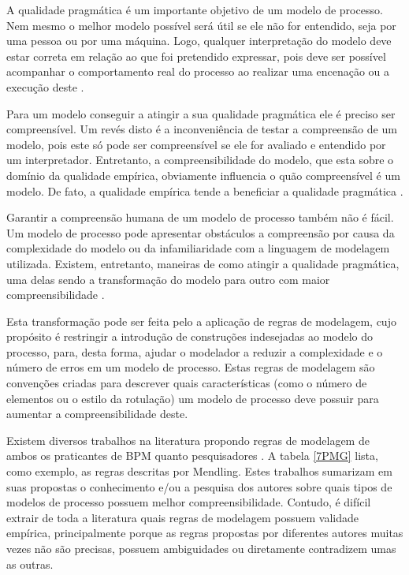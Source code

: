 \documentclass[12pt]{article}
\begin{document}
A qualidade pragmática é um importante objetivo de um modelo de processo. Nem mesmo o melhor modelo possível será útil se ele não for entendido, seja por uma pessoa ou por uma máquina. Logo, qualquer interpretação do modelo deve estar correta em relação ao que foi pretendido expressar, pois deve ser possível acompanhar o comportamento real do processo ao realizar uma encenação ou a execução deste \cite{Krogstie2012}.

Para um modelo conseguir a atingir a sua qualidade pragmática ele é preciso ser compreensível. Um revés disto é a inconveniência de testar a compreensão de um modelo, pois este só pode ser compreensível se ele for avaliado e entendido por um interpretador. Entretanto, a compreensibilidade do modelo, que esta sobre o domínio da qualidade empírica, obviamente influencia o quão compreensível é um modelo. De fato, a qualidade empírica tende a beneficiar a qualidade pragmática \cite{Krogstie2012}.

Garantir a compreensão humana de um modelo de processo também não é fácil. Um modelo de processo pode apresentar obstáculos a compreensão por causa da complexidade do modelo ou da infamiliaridade com a linguagem de modelagem utilizada. Existem, entretanto, maneiras de como atingir a qualidade pragmática, uma delas sendo a transformação do modelo para outro com maior compreensibilidade \cite{Krogstie2012}. 

Esta transformação pode ser feita pelo a aplicação de regras de modelagem, cujo propósito é restringir a introdução de construções indesejadas ao modelo do processo, para, desta forma, ajudar o modelador a reduzir a complexidade e o número de erros em um modelo de processo. Estas regras de modelagem são convenções criadas para descrever quais características (como o número de elementos ou o estilo da rotulação) um modelo de processo deve possuir para aumentar a compreensibilidade deste.

Existem diversos trabalhos na literatura propondo regras de modelagem de ambos os praticantes de BPM \cite{Silver2009} \cite{White2008} \cite{Allweyer2010} quanto pesquisadores \cite{Becker2000} \cite{Mendling2007} \cite{Vanderfeesten2008} \cite{Correia2012}. A tabela \ref{7PMG} lista, como exemplo, as regras descritas por Mendling. Estes trabalhos sumarizam em suas propostas o conhecimento e/ou a pesquisa dos autores sobre quais tipos de modelos de processo possuem melhor compreensibilidade. Contudo, é difícil extrair de toda a literatura quais regras de modelagem possuem validade empírica, principalmente porque as regras propostas por diferentes autores muitas vezes não são precisas, possuem ambiguidades ou diretamente contradizem umas as outras. 
\end{document}
